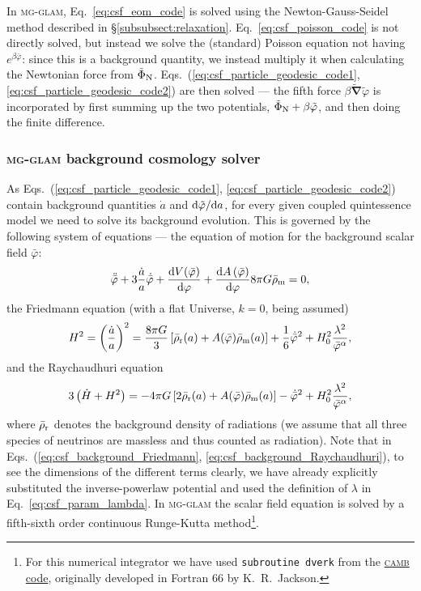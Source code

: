 In \textsc{mg}-\textsc{glam}, Eq.~\eqref{eq:csf_eom_code} is solved using the Newton-Gauss-Seidel method described in \S\ref{subsubsect:relaxation}. Eq.~\eqref{eq:csf_poisson_code} is not directly solved, but instead we solve the (standard) Poisson equation not having $e^{\beta\bar{\varphi}}$: since this is a background quantity, we instead multiply it when calculating the Newtonian force from $\tilde{\Phi}_{\rm N}$. Eqs.~(\ref{eq:csf_particle_geodesic_code1}, \ref{eq:csf_particle_geodesic_code2}) are then solved --- the fifth force $\beta\tilde{\boldsymbol{\nabla}}\tilde{\varphi}$ is incorporated by first summing up the two potentials, $\tilde{\Phi}_{\rm N}+\beta\tilde{\varphi}$, and then doing the finite difference.

\subsubsection*{\textsc{mg-glam} background cosmology solver}

As Eqs.~(\ref{eq:csf_particle_geodesic_code1}, \ref{eq:csf_particle_geodesic_code2}) contain background quantities $\dot{a}$ and ${\rm d}\tilde{\varphi}/{\rm d}a$, for every given coupled quintessence model we need to solve its background evolution. This is governed by the following system of equations --- the equation of motion for the background scalar field $\bar{\varphi}$:  
\begin{equation}\label{eq:csf_background_eom}
    \ddot{\bar{\varphi}} + 3\frac{\dot{a}}{a}\dot{\bar{\varphi}} + \frac{{\rm d}V(\bar{\varphi})}{{\rm d}\varphi} + \frac{{\rm d}A\left(\bar{\varphi}\right)}{{\rm d}\varphi}8\pi G\bar{\rho}_{\rm m} = 0,
\end{equation}
the Friedmann equation (with a flat Universe, $k=0$, being assumed)
\begin{equation}\label{eq:csf_background_Friedmann}
    H^2 = \left(\frac{\dot{a}}{a}\right)^2 = \frac{8\pi{G}}{3}\left[\bar{\rho}_{\rm r}(a) + A(\bar{\varphi})\bar{\rho}_{\rm m}(a)\right] + \frac{1}{6}\dot{\bar{\varphi}}^2+H_0^2\frac{\lambda^2}{\bar{\varphi}^\alpha},
\end{equation}
and the Raychaudhuri equation 
\begin{equation}\label{eq:csf_background_Raychaudhuri}
    3\left(\dot{H}+H^2\right) = -4\pi{G}\left[2\bar{\rho}_{\rm r}(a) + A(\bar{\varphi})\bar{\rho}_{\rm m}(a)\right] - \dot{\bar{\varphi}}^2+H_0^2\frac{\lambda^2}{\bar{\varphi}^\alpha},
\end{equation}
where $\bar{\rho}_{\rm r}$ denotes the background density of radiations (we assume that all three species of neutrinos are massless and thus counted as radiation). Note that in Eqs.~(\ref{eq:csf_background_Friedmann}, \ref{eq:csf_background_Raychaudhuri}), to see the dimensions of the different terms clearly, we have already explicitly substituted the inverse-powerlaw potential and used the definition of $\lambda$ in Eq.~\eqref{eq:csf_param_lambda}. In \textsc{mg-glam} the scalar field equation is solved by a fifth-sixth order continuous Runge-Kutta method\footnote{For this numerical integrator we have used \texttt{subroutine dverk} from the \href{https://camb.info/}{\textsc{camb} code}, originally developed in Fortran 66 by K.~R.~Jackson.}. 

